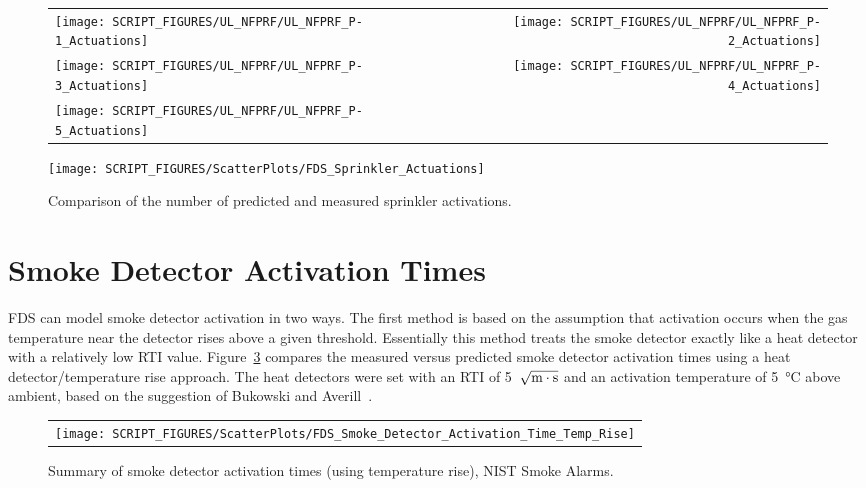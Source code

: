 \begin{figure}[p]
\begin{tabular*}{\textwidth}{l@{\extracolsep{\fill}}r}
\texttt{[image: SCRIPT\_FIGURES/UL\_NFPRF/UL\_NFPRF\_P-1\_Actuations]} &
\texttt{[image: SCRIPT\_FIGURES/UL\_NFPRF/UL\_NFPRF\_P-2\_Actuations]} \\
\texttt{[image: SCRIPT\_FIGURES/UL\_NFPRF/UL\_NFPRF\_P-3\_Actuations]} &
\texttt{[image: SCRIPT\_FIGURES/UL\_NFPRF/UL\_NFPRF\_P-4\_Actuations]} \\
\texttt{[image: SCRIPT\_FIGURES/UL\_NFPRF/UL\_NFPRF\_P-5\_Actuations]} &
\end{tabular*}
\label{UL_NFPRF_3_1}
\end{figure}

\begin{figure}[p]
\begin{center}
\texttt{[image: SCRIPT\_FIGURES/ScatterPlots/FDS\_Sprinkler\_Actuations]}
\end{center}
\caption[Comparison of the number of predicted and measured sprinkler activations]
{Comparison of the number of predicted and measured sprinkler activations.}
\label{UL_NFPRF}
\end{figure}




\clearpage

\section{Smoke Detector Activation Times}
\label{Smoke Detector Activation Time}
\label{Smoke Detector Activation Time, Temp. Rise}

FDS can model smoke detector activation in two ways. The first method is based on the assumption that activation occurs when the gas temperature near the detector rises above a given threshold. Essentially this method treats the smoke detector exactly like a heat detector with a relatively low RTI value. Figure~\ref{NIST_Smoke_Alarms_Scatterplot_Temp_Rise} compares the measured versus predicted smoke detector activation times using a heat detector/temperature rise approach. The heat detectors were set with an RTI of 5~$\sqrt{\hbox{m}\cdot \hbox{s}}$ and an activation temperature of \SI{5}{\celsius} above ambient, based on the suggestion of Bukowski and Averill~\cite{Bukowski:2}.

\begin{figure}[h!]
\begin{center}
\begin{tabular}{c}
\texttt{[image: SCRIPT\_FIGURES/ScatterPlots/FDS\_Smoke\_Detector\_Activation\_Time\_Temp\_Rise]}
\end{tabular}
\end{center}
\caption[Summary of smoke detector activation times (temperature rise), NIST Smoke Alarms.]
{Summary of smoke detector activation times (using temperature rise), NIST Smoke Alarms.}
\label{NIST_Smoke_Alarms_Scatterplot_Temp_Rise}
\end{figure}


